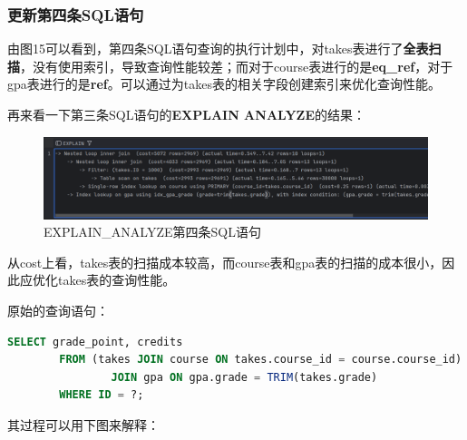 \documentclass{article}
\begin{document}
	\subsubsection{更新第四条SQL语句}
	
	由图15可以看到，第四条SQL语句查询的执行计划中，对takes表进行了\textbf{全表扫描}，没有使用索引，导致查询性能较差；而对于course表进行的是\textbf{eq\_ref}，对于gpa表进行的是\textbf{ref}。可以通过为takes表的相关字段创建索引来优化查询性能。
	
	再来看一下第三条SQL语句的\textbf{EXPLAIN ANALYZE}的结果：
	
	\begin{figure}[H]
		\centering
		\includegraphics[width=15cm]{./images/23.EXPLAIN_ANALYZE-4.png}
		\caption{EXPLAIN\_ANALYZE第四条SQL语句}
	\end{figure}
	
	从cost上看，takes表的扫描成本较高，而course表和gpa表的扫描的成本很小，因此应优化takes表的查询性能。
	
	原始的查询语句：
	
	\begin{lstlisting}[language=sql, title=原始的子串查询, tabsize=4]
		SELECT grade_point, credits
		FROM (takes JOIN course ON takes.course_id = course.course_id)
				JOIN gpa ON gpa.grade = TRIM(takes.grade)
		WHERE ID = ?;
	\end{lstlisting}
	
	其过程可以用下图来解释：
	
\end{document}
